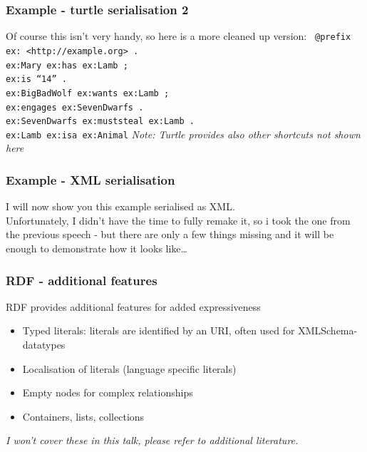 \documentclass{beamer}
\begin{document}
       \begin{frame}
           \frametitle{Example - turtle serialisation 2}
           Of course this isn't very handy, so here is a more cleaned up version:
           \footnotesize
           \vskip 0.7cm
           \texttt{ @prefix ex: <http://example.org> . \\
            ex:Mary          ex:has          ex:Lamb ; \\
                             ex:is           ``14''  . \\
            ex:BigBadWolf    ex:wants        ex:Lamb ; \\
                             ex:engages      ex:SevenDwarfs  . \\           
            ex:SevenDwarfs   ex:muststeal    ex:Lamb . \\
            ex:Lamb          ex:isa          ex:Animal}
           \normalsize
           \vskip 0.7cm
           \textit{Note: Turtle provides also other shortcuts not shown here}
       \end{frame}

       \begin{frame}
           \frametitle{Example - XML serialisation}
           \vskip 0.8cm
           I will now show you this example serialised as XML.\\
           Unfortunately, I didn't have the time to fully remake it, so i took
           the one from the previous speech - but there are only a few things missing and
           it will be enough to demonstrate how it looks like\ldots
       \end{frame}
 
       \begin{frame}
           \frametitle{RDF - additional features}

           RDF provides additional features for added expressiveness
           \vskip 0.7cm
           \pause
           \begin{itemize}
               \item Typed literals: literals are identified by an URI, often used for XMLSchema-datatypes
               \pause
               \item Localisation of literals (language specific literals)
               \pause
               \item Empty nodes for complex relationships
               \pause
               \item Containers, lists, collections
               \pause
           \end{itemize}
           \vskip 0.7cm
           \textit{I won't cover these in this talk, please refer to additional literature.}
       \end{frame}
\end{document}
